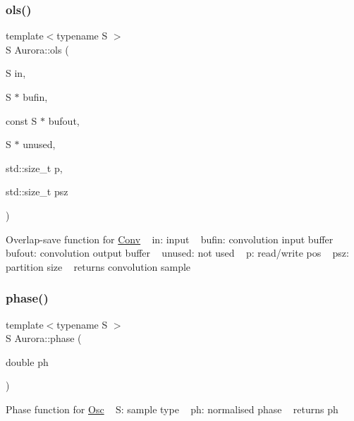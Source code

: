\subsubsection{\texorpdfstring{ols()}{ols()}}
{\footnotesize\ttfamily template$<$typename S $>$ \\
S Aurora\+::ols (\begin{DoxyParamCaption}\item[{S}]{in,  }\item[{S $\ast$}]{bufin,  }\item[{const S $\ast$}]{bufout,  }\item[{S $\ast$}]{unused,  }\item[{std\+::size\+\_\+t}]{p,  }\item[{std\+::size\+\_\+t}]{psz }\end{DoxyParamCaption})}

Overlap-\/save function for \hyperlink{class_aurora_1_1_conv}{Conv} ~\newline
in\+: input ~\newline
bufin\+: convolution input buffer ~\newline
bufout\+: convolution output buffer ~\newline
unused\+: not used ~\newline
p\+: read/write pos ~\newline
psz\+: partition size ~\newline
returns convolution sample \mbox{\label{namespace_aurora_a2fab91108d29c7101741bcd2ebe1ba72}} 
\subsubsection{\texorpdfstring{phase()}{phase()}}
{\footnotesize\ttfamily template$<$typename S $>$ \\
S Aurora\+::phase (\begin{DoxyParamCaption}\item[{double}]{ph }\end{DoxyParamCaption})}

Phase function for \hyperlink{class_aurora_1_1_osc}{Osc} ~\newline
S\+: sample type ~\newline
ph\+: normalised phase ~\newline
returns ph \mbox{\label{namespace_aurora_a388ea5736944d8887f5586afd45a03b8}} 
